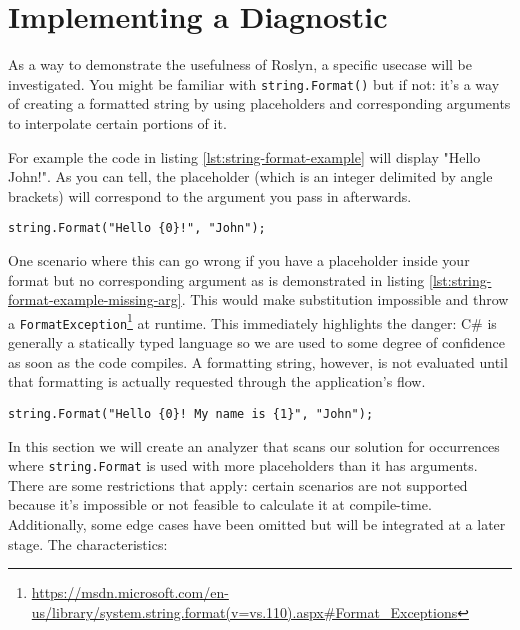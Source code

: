 \chapter{Implementing a Diagnostic}
\label{ch:diagnostic}

As a way to demonstrate the usefulness of Roslyn, a specific usecase will be investigated. You might be familiar with \texttt{string.Format()} but if not: it's a way of creating a formatted string by using placeholders and corresponding arguments to interpolate certain portions of it.

For example the code in listing \ref{lst:string-format-example} will display "Hello John!". As you can tell, the placeholder (which is an integer delimited by angle brackets) will correspond to the argument you pass in afterwards.

\begin{lstlisting}[label={lst:string-format-example}]
string.Format("Hello {0}!", "John");
\end{lstlisting}

One scenario where this can go wrong if you have a placeholder inside your format but no corresponding argument as is demonstrated in listing \ref{lst:string-format-example-missing-arg}. This would make substitution impossible and throw a \texttt{FormatException}\footnote{\url{https://msdn.microsoft.com/en-us/library/system.string.format(v=vs.110).aspx\#Format_Exceptions}} at runtime. This immediately highlights the danger: C\# is generally a statically typed language so we are used to some degree of confidence as soon as the code compiles. A formatting string, however, is not evaluated until that formatting is actually requested through the application's flow. 

\begin{lstlisting}[label={lst:string-format-example-missing-arg}]
string.Format("Hello {0}! My name is {1}", "John");
\end{lstlisting}

In this section we will create an analyzer that scans our \gls{solution} for occurrences where \texttt{string.Format} is used with more placeholders than it has arguments. 
There are some restrictions that apply: certain scenarios are not supported because it's impossible or not feasible to calculate it at compile-time. Additionally, some edge cases have been omitted but will be integrated at a later stage. The characteristics:

